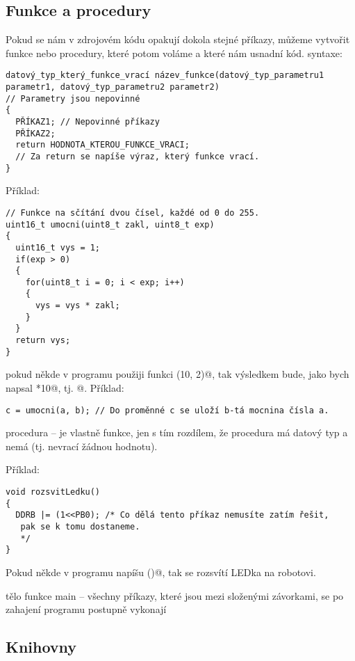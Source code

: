  
  
\subsection{Funkce a procedury} 

 Pokud se nám v zdrojovém kódu opakují dokola stejné příkazy, můžeme vytvořit funkce nebo procedury, které potom voláme a které nám usnadní kód.
syntaxe:
\begin{verbatim}
datový_typ_který_funkce_vrací název_funkce(datový_typ_parametru1 
parametr1, datový_typ_parametru2 parametr2) 
// Parametry jsou nepovinné
{
  PŘÍKAZ1; // Nepovinné příkazy
  PŘÍKAZ2;
  return HODNOTA_KTEROU_FUNKCE_VRACI; 
  // Za return se napíše výraz, který funkce vrací.
}
\end{verbatim}

Příklad:
\begin{verbatim}
// Funkce na sčítání dvou čísel, každé od 0 do 255.
uint16_t umocni(uint8_t zakl, uint8_t exp)
{
  uint16_t vys = 1;
  if(exp > 0)
  {
    for(uint8_t i = 0; i < exp; i++)
    {
      vys = vys * zakl; 
    }
  }
  return vys;
}
\end{verbatim}

pokud někde v programu použiji funkci \verb@secti(10, 2)@, tak výsledkem bude, jako bych napsal *10@, tj. @.
Příklad:
\begin{verbatim}
c = umocni(a, b); // Do proměnné c se uloží b-tá mocnina čísla a. 
\end{verbatim}

procedura -- je vlastně funkce, jen s tím rozdílem, že procedura má datový typ \verb@void@ %
a nemá \verb@return@ (tj. nevrací žádnou hodnotu).

Příklad:
\begin{verbatim}
void rozsvitLedku()
{
  DDRB |= (1<<PB0); /* Co dělá tento příkaz nemusíte zatím řešit,
   pak se k tomu dostaneme.
   */
}
\end{verbatim}

Pokud někde v programu napíšu \verb@rozsvitLedku()@, tak se rozsvítí LEDka na robotovi.

tělo funkce main -- všechny příkazy, které jsou mezi složenými závorkami, se po zahajení programu postupně vykonají

\subsection{Knihovny}

